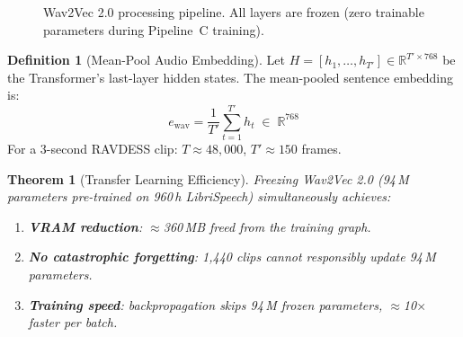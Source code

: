 \documentclass[12pt,a4paper]{article}
\theoremstyle{definition}
\newtheorem{definition}{Definition}[section]
\theoremstyle{plain}
\newtheorem{theorem}{Theorem}[section]
\theoremstyle{remark}
\begin{document}
\begin{figure}[H]
\centering
{}
\caption{Wav2Vec 2.0 processing pipeline.  All layers are frozen (zero trainable
parameters during Pipeline~C training).}
\end{figure}

\begin{definition}[Mean-Pool Audio Embedding]
Let $H = [h_1,\ldots,h_{T'}] \in \mathbb{R}^{T'\times 768}$ be the Transformer's
last-layer hidden states.  The mean-pooled sentence embedding is:
\[
  e_{\text{wav}} = \frac{1}{T'}\sum_{t=1}^{T'} h_t \;\in\; \mathbb{R}^{768}
\]
For a 3-second RAVDESS clip: $T\approx48{,}000$, $T'\approx 150$ frames.
\end{definition}

\begin{theorem}[Transfer Learning Efficiency]
\label{thm:transfer}
Freezing Wav2Vec 2.0 (94\,M parameters pre-trained on 960\,h LibriSpeech)
simultaneously achieves:
\begin{enumerate}[nosep]
  \item \textbf{VRAM reduction}: $\approx$360\,MB freed from the training graph.
  \item \textbf{No catastrophic forgetting}: 1,440 clips cannot responsibly update 94\,M parameters.
  \item \textbf{Training speed}: backpropagation skips 94\,M frozen parameters, $\approx$10$\times$ faster per batch.
\end{enumerate}
\end{theorem}
\end{document}
